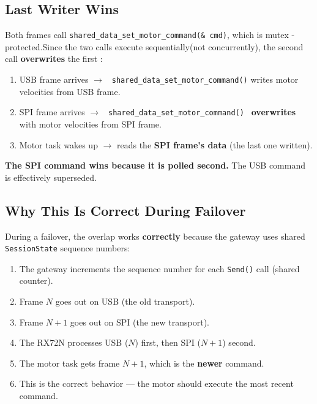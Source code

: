 \vspace { 0.3cm}

\subsection{Last Writer Wins}

Both frames call \texttt{shared\_data\_set\_motor\_command(\& cmd)},
    which is mutex -
        protected.Since the two calls execute sequentially(not concurrently),
    the second call \textbf{overwrites} the first :

\begin{enumerate}[leftmargin = 1.5em, topsep = 4pt, itemsep = 2pt]
    \item USB frame arrives $\rightarrow$ \texttt{
        shared\_data\_set\_motor\_command()} writes motor
    velocities from USB frame.
    \item SPI frame arrives $\rightarrow$ \texttt {
  shared\_data\_set\_motor\_command()
}
\textbf{overwrites} with motor velocities from SPI frame.
    \item Motor task wakes up $\rightarrow$ reads the \textbf{SPI frame's data} (the last one written).
\end{enumerate}

\textbf{The SPI command wins because it is polled second.} The USB command is effectively superseded.

\subsection{Why This Is Correct During Failover}

During a failover, the overlap works \textbf{correctly} because the gateway uses shared \texttt{SessionState} sequence numbers:

\begin{enumerate}[leftmargin=1.5em,topsep=4pt,itemsep=2pt]
    \item The gateway increments the sequence number for each \texttt{Send()} call (shared counter).
    \item Frame $N$ goes out on USB (the old transport).
    \item Frame $N+1$ goes out on SPI (the new transport).
    \item The RX72N processes USB ($N$) first, then SPI ($N+1$) second.
    \item The motor task gets frame $N+1$, which is the \textbf{newer} command.
    \item This is the correct behavior --- the motor should execute the most recent command.
\end{enumerate}

